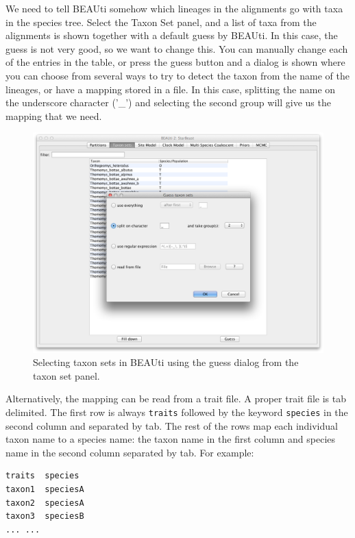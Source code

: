 \documentclass{article}
\begin{document}
We need to tell BEAUti somehow which lineages in the alignments go with taxa in the species tree. Select the Taxon Set panel, and a list of taxa from the alignments is shown together with a default guess by BEAUti. In this case, the guess is not very good, so we want to change this. You can manually change each of the entries in the table, or press the guess button and a dialog is shown where you can choose from several ways to try to detect the taxon from the name of the lineages, or have a mapping stored in a file. In this case, splitting the name on the underscore character ('\_') and selecting the second group will give us the mapping that we need.

\begin{figure}
\begin{center}

\includegraphics[scale=0.4]{figures/BEAUti_Guess_Taxonsets}

\end{center}
\caption{\label{fig.taxonset} Selecting taxon sets in BEAUti using the guess dialog from the taxon set panel.}
\end{figure}


Alternatively, the mapping can be read from a trait file.
A proper trait file is tab delimited. The first row is always \texttt{traits} followed by the keyword \texttt{species} in the second column and separated by tab. The rest of the rows map each individual taxon name to a species name: the taxon name in the first column and species name in the second column separated by tab. For example:

\begin{verbatim}
traits	species
taxon1	speciesA
taxon2	speciesA
taxon3	speciesB
... ...
\end{verbatim}
\end{document}
